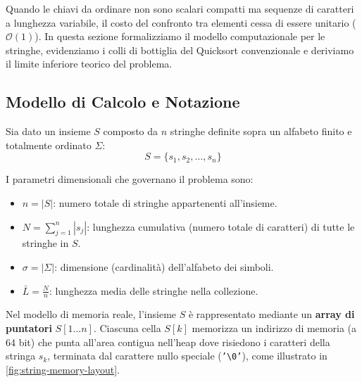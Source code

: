 Quando le chiavi da ordinare non sono scalari compatti ma sequenze di caratteri a lunghezza variabile, il costo del confronto tra elementi cessa di essere unitario ($\mathcal{O}(1)$). In questa sezione formalizziamo il modello computazionale per le stringhe, evidenziamo i colli di bottiglia del Quicksort convenzionale e deriviamo il limite inferiore teorico del problema.

\FloatBarrier
\subsection{Modello di Calcolo e Notazione}
\label{subsec:modello-string-sorting}

Sia dato un insieme $S$ composto da $n$ stringhe definite sopra un alfabeto finito e totalmente ordinato $\Sigma$:
\begin{equation}
  S = \{s_1, s_2, \dots, s_n\}
\end{equation}

I parametri dimensionali che governano il problema sono:
\begin{itemize}
  \item $n = |S|$: numero totale di stringhe appartenenti all'insieme.
  \item $N = \sum_{j=1}^n |s_j|$: lunghezza cumulativa (numero totale di caratteri) di tutte le stringhe in $S$.
  \item $\sigma = |\Sigma|$: dimensione (cardinalit\`a) dell'alfabeto dei simboli.
  \item $\bar{L} = \frac{N}{n}$: lunghezza media delle stringhe nella collezione.
\end{itemize}

Nel modello di memoria reale, l'insieme $S$ \`e rappresentato mediante un \textbf{array di puntatori} $S[1 \dots n]$. Ciascuna cella $S[k]$ memorizza un indirizzo di memoria (a 64 bit) che punta all'area contigua nell'heap dove risiedono i caratteri della stringa $s_k$, terminata dal carattere nullo speciale (\texttt{'\textbackslash0'}), come illustrato in \autoref{fig:string-memory-layout}.

